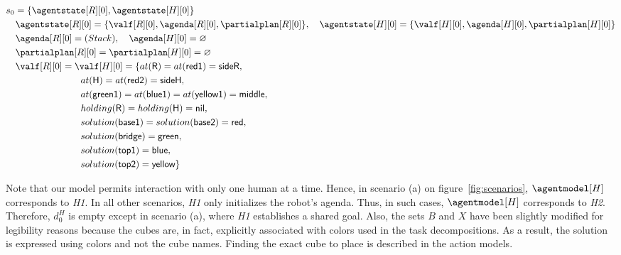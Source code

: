 {\small
\begin{align*}
&s_0 = \{\agentstate[R][0], \agentstate[H][0]\} \\
&\quad \agentstate[R][0] = \{ \valf[R][0], \agenda[R][0], \partialplan[R][0] \}, \quad \agentstate[H][0] = \{ \valf[H][0], \agenda[H][0], \partialplan[H][0] \} \\
&\quad \agenda[R][0] = ( Stack ), \quad \agenda[H][0] = \varnothing \\
&\quad \partialplan[R][0] = \partialplan[H][0] = \varnothing \\
&\quad \valf[R][0] = \valf[H][0] = \{ at(\textsf{R}) = at(\textsf{red1}) = \textsf{sideR}, \\
&\quad \quad \quad \quad \quad \quad \quad \quad at(\textsf{H}) = at(\textsf{red2}) = \textsf{sideH}, \\
&\quad \quad \quad \quad \quad \quad \quad \quad at(\textsf{green1}) = at(\textsf{blue1}) = at(\textsf{yellow1}) = \textsf{middle}, \\
&\quad \quad \quad \quad \quad \quad \quad \quad holding(\textsf{R}) = holding(\textsf{H}) = \textsf{nil}, \\
&\quad \quad \quad \quad \quad \quad \quad \quad solution(\textsf{base1}) = solution(\textsf{base2}) = \textsf{red}, \\
&\quad \quad \quad \quad \quad \quad \quad \quad solution(\textsf{bridge}) = \textsf{green},   \\
&\quad \quad \quad \quad \quad \quad \quad \quad solution(\textsf{top1}) = \textsf{blue}, \\
&\quad \quad \quad \quad \quad \quad \quad \quad solution(\textsf{top2}) = \textsf{yellow} \}  \\
\end{align*}
}

Note that our model permits interaction with only one human at a time. Hence, in scenario (a) on figure~\ref{fig:scenarios}, $\agentmodel[H]$ corresponds to \textit{H1}. In all other scenarios, \textit{H1} only initializes the robot's agenda. Thus, in such cases, $\agentmodel[H]$ corresponds to \textit{H2}.
Therefore, $d^H_0$ is empty except in scenario (a), where \textit{H1} establishes a shared goal. Also, the sets $B$ and $X$ have been slightly modified for legibility reasons because the cubes are, in fact, explicitly associated with colors used in the task decompositions. As a result, the solution is expressed using colors and not the cube names. Finding the exact cube to place is described in the action models.

